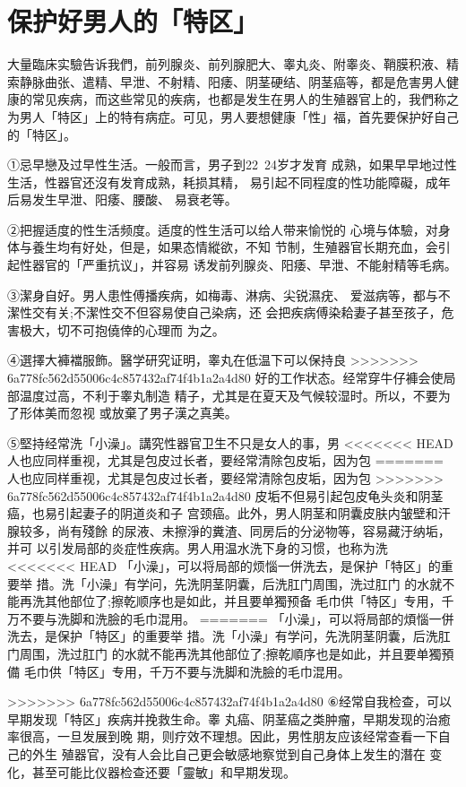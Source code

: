 \documentclass[12pt,UTF8]{ctexbook}
\begin{document}
\section{保护好男人的「特区」}

大量臨床实驗告诉我們，前列腺炎、前列腺肥大、睾丸炎、附睾炎、鞘膜积液、精索静脉曲张、遣精、早泄、不射精、阳痿、阴茎硬结、阴茎癌等，都是危害男人健康的常见疾病，而这些常见的疾病，也都是发生在男人的生殖器官上的，我們称之为男人「特区」上的特有病症。可见，男人要想健康「性」福，首先要保护好自己的「特区」。

①忌早戀及过早性生活。一般而言，男子到22~24岁才发育
成熟，如果早早地过性生活，性器官还沒有发育成熟，耗损其精，
易引起不同程度的性功能障礙，成年后易发生早泄、阳痿、腰酸、
易衰老等。

②把握适度的性生活频度。适度的性生活可以给人带来愉悦的
心境与体驗，对身体与養生均有好处，但是，如果态情縱欲，不知
节制，生殖器官长期充血，会引起性器官的「严重抗议」，并容易
诱发前列腺炎、阳痿、早泄、不能射精等毛病。

③潔身自好。男人患性傅播疾病，如梅毒、淋病、尖锐濕疣、
爱滋病等，都与不潔性交有关;不潔性交不但容易使自己染病，还
会把疾病傅染耠妻子甚至孩子，危害极大，切不可抱僥倖的心理而
为之。

④選擇大褲襠服飾。醫学研究证明，睾丸在低温下可以保持良
>>>>>>> 6a778fc562d55006c4c857432af74f4b1a2a4d80
好的工作状态。经常穿牛仔褲会使局部温度过高，不利于睾丸制造
精子，尤其是在夏天及气候较湿时。所以，不要为了形体美而忽视
或放棄了男子漢之真美。

⑤堅持经常洗「小澡」。講究性器官卫生不只是女人的事，男
<<<<<<< HEAD
人也应同样重视，尤其是包皮过长者，要经常清除包皮垢，因为包
=======
人也应同样重视，尤其是包皮过长者，要经常清除包皮垢，因为包
>>>>>>> 6a778fc562d55006c4c857432af74f4b1a2a4d80
皮垢不但易引起包皮龟头炎和阴茎癌，也易引起妻子的阴道炎和子
宫颈癌。此外，男人阴茎和阴囊皮肤内皱壁和汗腺较多，尚有殘餘
的尿液、未擦淨的糞渣、同房后的分泌物等，容易藏汙纳垢，并可
以引发局部的炎症性疾病。男人用温水洗下身的习惯，也称为洗
<<<<<<< HEAD
「小澡」，可以将局部的烦惱一併洗去，是保护「特区」的重要举
措。洗「小澡」有学问，先洗阴茎阴囊，后洗肛门周围，洗过肛门
的水就不能再洗其他部位了;擦乾顺序也是如此，并且要单獨预备
毛巾供「特区」专用，千万不要与洗脚和洗臉的毛巾混用。
=======
「小澡」，可以将局部的煩惱一併洗去，是保护「特区」的重要举
措。洗「小澡」有学问，先洗阴茎阴囊，后洗肛门周围，洗过肛门
的水就不能再洗其他部位了;擦乾順序也是如此，并且要单獨預備
毛巾供「特区」专用，千万不要与洗脚和洗臉的毛巾混用。

>>>>>>> 6a778fc562d55006c4c857432af74f4b1a2a4d80
⑥经常自我检查，可以早期发现「特区」疾病并挽救生命。睾
丸癌、阴茎癌之类肿瘤，早期发现的治癒率很高，一旦发展到晚
期，则疗效不理想。因此，男性朋友应该经常查看一下自己的外生
殖器官，没有人会比自己更会敏感地察觉到自己身体上发生的潛在
变化，甚至可能比仪器检查还要「靈敏」和早期发现。
\end{document}
